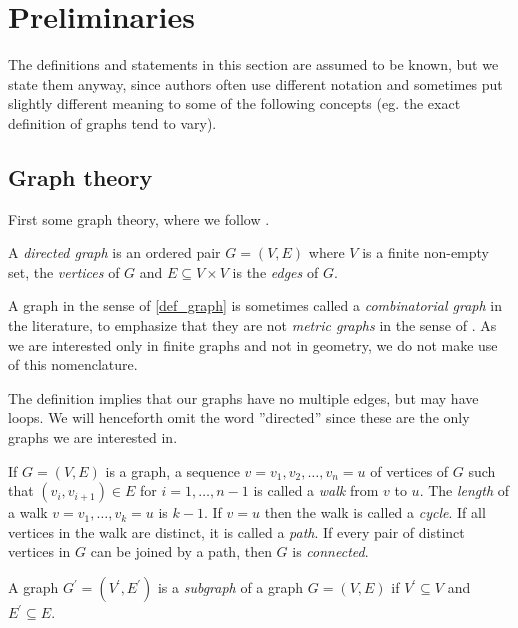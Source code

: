 \chapter{Preliminaries}
The definitions and statements in this section are assumed to be
known, but we state them anyway, since authors often use different
notation and sometimes put slightly different meaning to some of the
following concepts (eg. the exact definition of graphs tend to
vary). 

\section{Graph theory}
First some graph theory, where we follow \cite{biggs89}.

\begin{deff} \label{def_graph}
A \emph{directed graph} is an ordered pair $G = (V, E)$ where $V$ is a finite non-empty set, the \emph{vertices} of $G$ and $E \subseteq V \times V$ is the \emph{edges} of $G$.
\end{deff}
\begin{remark}
  A graph in the sense of \ref{def_graph} is sometimes called a
  \emph{combinatorial graph} in the literature, to emphasize that they
  are not \emph{metric graphs} in the sense of \cite{bridson99}. As we
  are interested only in finite graphs and not in geometry, we do not
  make use of this nomenclature.
\end{remark}

\begin{remark}
The definition implies that our graphs have no multiple edges, but may have loops. We will henceforth omit the word ''directed'' since these are the only
graphs we are interested in.
\end{remark}

\begin{deff} \label{def_graph_misc}
If $G = (V, E)$ is a graph, a sequence $v = v_1, v_2, \dotsc, v_n =
  u$ of vertices of $G$ such that $(v_i, v_{i + 1}) \in E$ for $i = 1,
  \dotsc, n - 1$ is called a \emph{walk} from $v$ to $u$. The \emph{length} of a walk $v = v_1, \dotsc, v_k = u$ is $k - 1$. If $v = u$
  then the walk is called a \emph{cycle}. If all vertices in the walk are
  distinct, it is called a \emph{path}. If every pair of distinct vertices in $G$ can be joined by a path, then $G$ is \emph{connected}.
\end{deff}

\begin{deff}
A graph $G^{\prime} = (V^{\prime}, E^{\prime})$ is a \emph{subgraph} of a graph $G = (V, E)$ if $V^{\prime} \subseteq V$ and $E^{\prime} \subseteq E$.
\end{deff}

